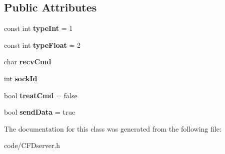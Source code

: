 \subsection*{Public Attributes}
\begin{DoxyCompactItemize}
\item 
\mbox{\label{class_c_f_driver_a2dc6ace83c2b9ae54e89a47476d31c6d}} 
const int {\bfseries type\+Int} = 1
\item 
\mbox{\label{class_c_f_driver_a7ca463d67e1600367a58c4d5f4849d3f}} 
const int {\bfseries type\+Float} = 2
\item 
\mbox{\label{class_c_f_driver_aa46f2d8cb795a45613904ef096f03168}} 
char {\bfseries recv\+Cmd}
\item 
\mbox{\label{class_c_f_driver_a59edc8485a4a23728410d8eff351d645}} 
int {\bfseries sock\+Id}
\item 
\mbox{\label{class_c_f_driver_a995588602022c965c3cfde5fbc235d5d}} 
bool {\bfseries treat\+Cmd} = false
\item 
\mbox{\label{class_c_f_driver_a7cfbb10b47a62362dfb3e35461497bbc}} 
bool {\bfseries send\+Data} = true
\end{DoxyCompactItemize}


The documentation for this class was generated from the following file\+:\begin{DoxyCompactItemize}
\item 
code/C\+F\+Dserver.\+h\end{DoxyCompactItemize}
